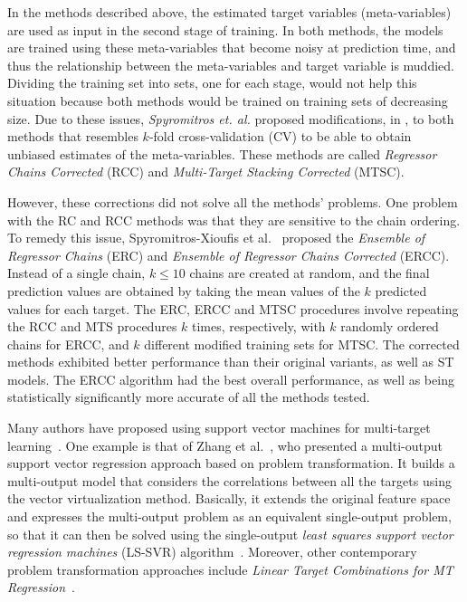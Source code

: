 \documentclass[reqno]{vcuthesis}
\numberwithin{equation}{chapter}
\begin{document}
In the methods described above, the estimated target variables (meta-variables) are used as input in the second stage of training. In both methods, the models are trained using these meta-variables that become noisy at prediction time, and thus the relationship between the meta-variables and target variable is muddied. Dividing the training set into sets, one for each stage, would not help this situation because both methods would be trained on training sets of decreasing size. Due to these issues, \textit{Spyromitros et. al.} proposed modifications, in \cite{Spyromitros2014}, to both methods that resembles $k$-fold cross-validation (CV) to be able to obtain unbiased estimates of the meta-variables. These methods are called \textit{Regressor Chains Corrected} (RCC) and \textit{Multi-Target Stacking Corrected} (MTSC). 

However, these corrections did not solve all the methods' problems. One problem with the RC and RCC methods was that they are sensitive to the chain ordering. To remedy this issue, Spyromitros-Xioufis et al.~\cite{Spyromitros2014} proposed the \textit{Ensemble of Regressor Chains} (ERC) and \textit{Ensemble of Regressor Chains Corrected} (ERCC). Instead of a single chain, $k \leq 10$ chains are created at random, and the final prediction values are obtained by taking the mean values of the $k$ predicted values for each target. The ERC, ERCC and MTSC procedures involve repeating the RCC and MTS procedures $k$ times, respectively, with $k$ randomly ordered chains for ERCC, and $k$ different modified training sets for MTSC. The corrected methods exhibited better performance than their original variants, as well as ST models. The ERCC algorithm had the best overall performance, as well as being statistically significantly more accurate of all the methods tested\cite{Spyromitros2014}.

Many authors have proposed using support vector machines for multi-target learning~\cite{Borchani2015,Xiong2014,Xu2013}. One example is that of Zhang et al.~\cite{Zhang2012}, who presented a multi-output support vector regression approach based on problem transformation. It builds a multi-output model that considers the correlations between all the targets using the vector virtualization method. Basically, it extends the original feature space and expresses the multi-output problem as an equivalent single-output problem, so that it can then be solved using the single-output \textit{least squares support vector regression machines} (LS-SVR) algorithm~\cite{suykens1999least}. Moreover, other contemporary problem transformation approaches include \textit{Linear Target Combinations for MT Regression}~\cite{Tsoumakas2014}.
\end{document}
